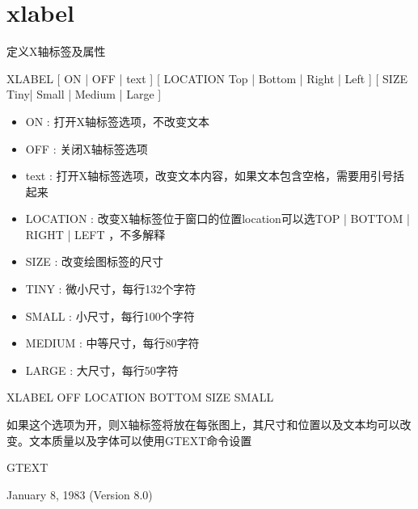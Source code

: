 \section{xlabel}
\label{cmd:xlabel}

定义X轴标签及属性

XLABEL [ ON | OFF | text ] [ LOCATION Top | Bottom | Right | Left ] [ SIZE Tiny| Small | Medium | Large ]

\begin{itemize}
\item ON : 打开X轴标签选项，不改变文本 
\item OFF : 关闭X轴标签选项 
\item text : 打开X轴标签选项，改变文本内容，如果文本包含空格，需要用引号括起来
\item LOCATION : 改变X轴标签位于窗口的位置location可以选TOP | BOTTOM | RIGHT | LEFT ，不多解释
\item SIZE :  改变绘图标签的尺寸 
\item TINY : 微小尺寸，每行132个字符
\item SMALL :  小尺寸，每行100个字符 
\item MEDIUM : 中等尺寸，每行80字符 
\item LARGE : 大尺寸，每行50字符 
\end{itemize}

XLABEL OFF LOCATION BOTTOM SIZE SMALL

如果这个选项为开，则X轴标签将放在每张图上，其尺寸和位置以及文本均可以改变。文本质量以及字体可以使用GTEXT命令设置

GTEXT

January 8, 1983 (Version 8.0)
